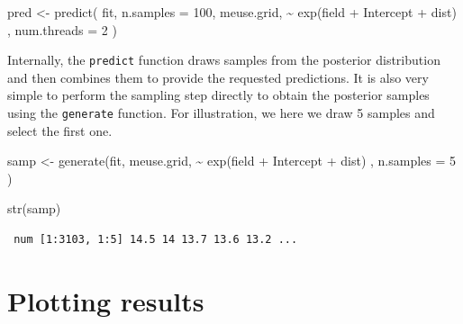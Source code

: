 \documentclass[
  a4paper,
]{article}
\newenvironment{Shaded}{\begin{snugshade}}{\end{snugshade}}
\newcommand{\AttributeTok}[1]{\textcolor[rgb]{0.40,0.45,0.13}{#1}}
\newcommand{\DecValTok}[1]{\textcolor[rgb]{0.68,0.00,0.00}{#1}}
\newcommand{\FunctionTok}[1]{\textcolor[rgb]{0.28,0.35,0.67}{#1}}
\newcommand{\NormalTok}[1]{\textcolor[rgb]{0.00,0.23,0.31}{#1}}
\newcommand{\OtherTok}[1]{\textcolor[rgb]{0.00,0.23,0.31}{#1}}
\newcommand{\SpecialCharTok}[1]{\textcolor[rgb]{0.37,0.37,0.37}{#1}}
\begin{document}
\begin{Shaded}
\begin{Highlighting}[]
\NormalTok{pred }\OtherTok{\textless{}{-}} \FunctionTok{predict}\NormalTok{(}
\NormalTok{  fit,}
  \AttributeTok{n.samples =} \DecValTok{100}\NormalTok{,}
\NormalTok{  meuse.grid,}
  \SpecialCharTok{\textasciitilde{}} \FunctionTok{exp}\NormalTok{(field }\SpecialCharTok{+}\NormalTok{ Intercept }\SpecialCharTok{+}\NormalTok{ dist) ,}
  \AttributeTok{num.threads =} \DecValTok{2}
\NormalTok{)}
\end{Highlighting}
\end{Shaded}

Internally, the \texttt{predict} function draws samples from the
posterior distribution and then combines them to provide the requested
predictions. It is also very simple to perform the sampling step
directly to obtain the posterior samples using the \texttt{generate}
function. For illustration, we here we draw 5 samples and select the
first one.

\begin{Shaded}
\begin{Highlighting}[]
\NormalTok{samp }\OtherTok{\textless{}{-}} \FunctionTok{generate}\NormalTok{(fit, }
\NormalTok{                 meuse.grid,}
                 \SpecialCharTok{\textasciitilde{}} \FunctionTok{exp}\NormalTok{(field }\SpecialCharTok{+}\NormalTok{ Intercept }\SpecialCharTok{+}\NormalTok{ dist) ,}
                 \AttributeTok{n.samples =} \DecValTok{5}
\NormalTok{)}

\FunctionTok{str}\NormalTok{(samp)}
\end{Highlighting}
\end{Shaded}

\begin{verbatim}
 num [1:3103, 1:5] 14.5 14 13.7 13.6 13.2 ...
\end{verbatim}

\begin{Shaded}
\end{Shaded}

\hypertarget{plotting-results}{%
\section{Plotting results}\label{plotting-results}}
\end{document}
